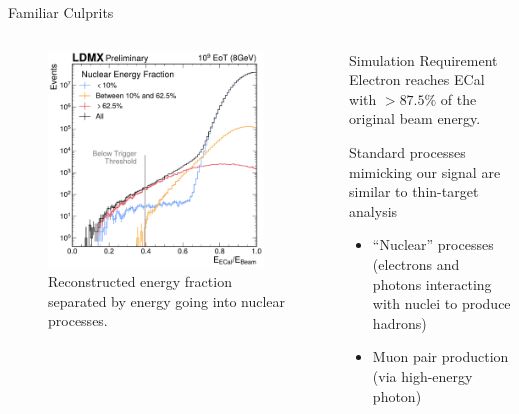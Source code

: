 \documentclass[aspectratio=169]{beamer}
\begin{document}
\begin{frame}{Familiar Culprits}
  \begin{columns}
    \begin{column}{0.45\textwidth}
      \begin{figure}
        \centering
        \includegraphics[width=0.9\textwidth]{../figures/ldmx/simulation/8gev-ecal-by-nuc.pdf}
        \caption{\footnotesize Reconstructed energy fraction separated by 
        energy going into nuclear processes.}
      \end{figure}
    \end{column}
    \begin{column}{0.55\textwidth}
      \begin{block}{Simulation Requirement}
        Electron reaches ECal with $> 87.5\%$ of the original beam energy.
      \end{block}

      Standard processes mimicking our signal are similar to thin-target analysis
      \begin{itemize}
        \item ``Nuclear'' processes (electrons and photons interacting with nuclei to produce hadrons)
        \item Muon pair production (via high-energy photon)
      \end{itemize}
    \end{column}
  \end{columns}
\end{frame}
\end{document}
